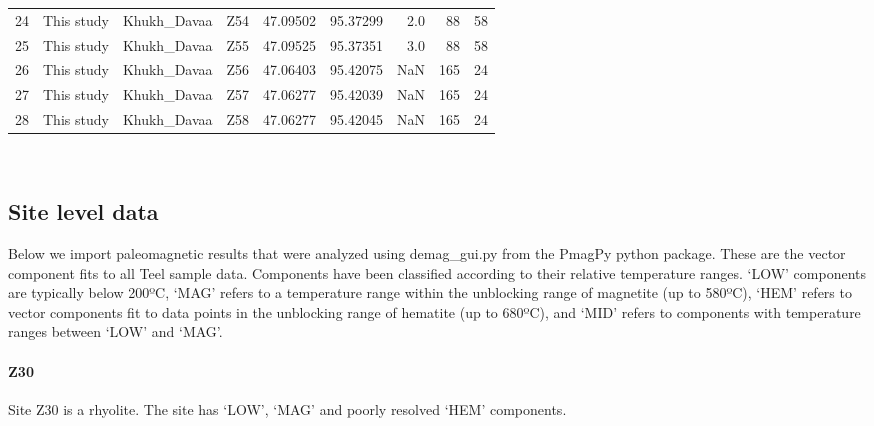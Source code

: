 \documentclass[11pt]{article}
\begin{document}
{\begin{tabular}{llllrrrrr}
24 &        This study &     Khukh\_Davaa  &          Z54 &  47.09502 &  95.37299 &        2.0 &                        88 &              58 \\
25 &        This study &     Khukh\_Davaa  &          Z55 &  47.09525 &  95.37351 &        3.0 &                        88 &              58 \\
26 &        This study &     Khukh\_Davaa  &          Z56 &  47.06403 &  95.42075 &        NaN &                       165 &              24 \\
27 &        This study &     Khukh\_Davaa  &          Z57 &  47.06277 &  95.42039 &        NaN &                       165 &              24 \\
28 &        This study &     Khukh\_Davaa  &          Z58 &  47.06277 &  95.42045 &        NaN &                       165 &              24 \\
\bottomrule
\end{tabular}}

    


    \begin{center}
    \end{center}
    { \hspace*{\fill} \\}
    
    \subsection{Site level data}\label{site-level-data}

    Below we import paleomagnetic results that were analyzed using
demag\_gui.py from the PmagPy python package. These are the vector
component fits to all Teel sample data. Components have been classified
according to their relative temperature ranges. `LOW' components are
typically below 200ºC, `MAG' refers to a temperature range within the
unblocking range of magnetite (up to 580ºC), `HEM' refers to vector
components fit to data points in the unblocking range of hematite (up to
680ºC), and `MID' refers to components with temperature ranges between
`LOW' and `MAG'.


    \paragraph{Z30}\label{z30}

    Site Z30 is a rhyolite. The site has `LOW', `MAG' and poorly resolved
`HEM' components.
\end{document}
